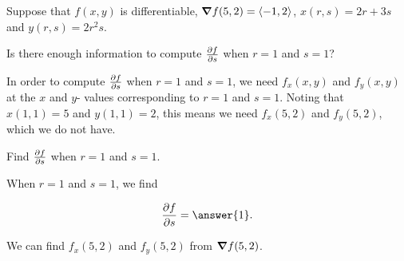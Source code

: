 \documentclass{ximera}
\author{Jim Talamo}
\begin{document}
\begin{exercise}

Suppose that $f(x,y)$ is differentiable, $\grad{f}(5,2) = \vector{-1,2}$, $x(r,s)=2r+3s$ and $y(r,s) = 2r^2s$.

Is there enough information to compute $\pp[f]{s}$ when $r=1$ and $s=1$?

\begin{multipleChoice}
\end{multipleChoice}

\begin{feedback}[correct]
In order to compute $\pp[f]{s}$ when $r=1$ and $s=1$, we need $f_x(x,y)$ and $f_y(x,y)$ at the $x$ and $y$- values corresponding to $r=1$ and $s=1$.  Noting that $x(1,1) = 5$ and $y(1,1) = 2$, this means we need $f_x(5,2)$ and $f_y(5,2)$, which we do not have.
\end{feedback}

\begin{exercise}

Find $\pp[f]{s}$ when $r=1$ and $s=1$.

When $r=1$ and $s=1$, we find 

\[
\pp[f]{s} = \answer{1}.
\]

\begin{hint}
We can find $f_x(5,2)$ and $f_y(5,2)$ from $\grad{f}(5,2)$.
\end{hint}
\end{exercise}

\end{exercise}
\end{document}

